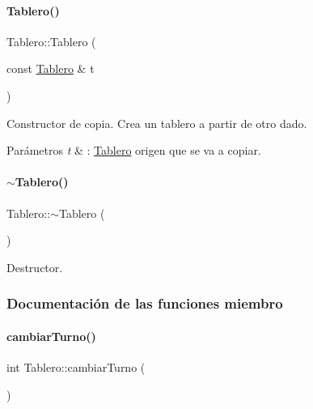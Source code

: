 \paragraph{\texorpdfstring{Tablero()}{Tablero()}\hspace{0.1cm}{\footnotesize\ttfamily [3/3]}}
{\footnotesize\ttfamily Tablero\+::\+Tablero (\begin{DoxyParamCaption}\item[{const \hyperlink{classTablero}{Tablero} \&}]{t }\end{DoxyParamCaption})}



Constructor de copia. Crea un tablero a partir de otro dado. 


\begin{DoxyParams}{Parámetros}
{\em t} & \+: \hyperlink{classTablero}{Tablero} origen que se va a copiar. \\
\hline
\end{DoxyParams}
\hypertarget{classTablero_a7d4a64967ce0bbe2cce49ec846834c84}{}\label{classTablero_a7d4a64967ce0bbe2cce49ec846834c84} 
\paragraph{\texorpdfstring{$\sim$\+Tablero()}{~Tablero()}}
{\footnotesize\ttfamily Tablero\+::$\sim$\+Tablero (\begin{DoxyParamCaption}{ }\end{DoxyParamCaption})\hspace{0.3cm}{\ttfamily [inline]}}



Destructor. 



\subsubsection{Documentación de las funciones miembro}
\hypertarget{classTablero_a6a07659599bca3442cce101d7bf42b9a}{}\label{classTablero_a6a07659599bca3442cce101d7bf42b9a} 
\paragraph{\texorpdfstring{cambiar\+Turno()}{cambiarTurno()}}
{\footnotesize\ttfamily int Tablero\+::cambiar\+Turno (\begin{DoxyParamCaption}{ }\end{DoxyParamCaption})}




